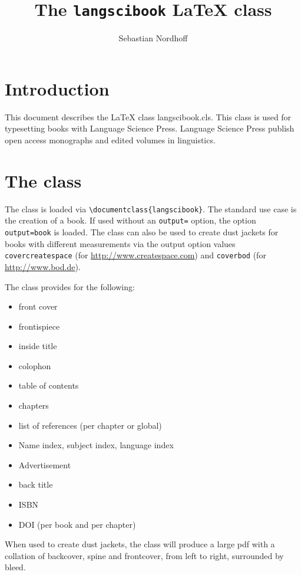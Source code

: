\documentclass[modfonts,output=guidelines]{langscibook}
\author{Sebastian Nordhoff}
\title{The \texttt{langscibook} {\LaTeX} class}
\subtitle{}
\begin{document}
\maketitle

\frontmatter
{} %
\tableofcontents
% 
% 
%  

\mainmatter       
\chapter{Introduction}
This document describes the {\LaTeX} class langscibook.cls. This class is used for typesetting books with Language Science Press. Language Science Press publish open access monographs and edited volumes in linguistics. 


\chapter{The class}
The class is loaded via \verb+\documentclass{langscibook}+. The standard use case is the creation of a book. If used without an \texttt{output=} option, the option \texttt{output=book} is loaded. The class can also be used to create dust jackets for books with different measurements via the output option values 
\texttt{covercreatespace} (for \url{http://www.createspace.com}) and
\texttt{coverbod} (for \url{http://www.bod.de}).

The class provides for the following:
\begin{itemize}
 \item front cover
 \item frontispiece 
 \item inside title 
 \item colophon 
 \item table of contents
 \item chapters 
 \item list of references (per chapter or global)
 \item Name index, subject index, language index
 \item Advertisement 
 \item back title 
 \item ISBN
 \item DOI (per book and per chapter)
\end{itemize}

When used to create dust jackets, the class will produce a large pdf with a collation of backcover, spine and frontcover, from left to right, surrounded by bleed.
\end{document}

